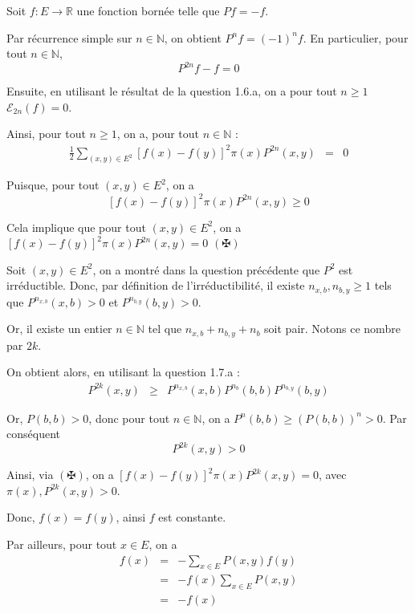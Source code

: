 Soit $f : E \rightarrow \mathbb{R}$ une fonction born{\'e}e telle que $P f = -
f$.

Par r{\'e}currence simple sur $n \in \mathbb{N}$, on obtient $P^n f = (- 1)^n
f$. En particulier, pour tout $n \in \mathbb{N}$,
\[ P^{2 n} f - f = 0 \]


Ensuite, en utilisant le r{\'e}sultat de la question 1.6.a, on a pour tout $n
\geqslant 1$ $\mathcal{E}_{2 n} (f) = 0$.

Ainsi, pour tout $n \geqslant 1$, on a, pour tout $n \in \mathbb{N}$ :
\[ \begin{array}{lll}
     \frac{1}{2} \underset{(x, y) \in E^2}{\sum}  [f (x) - f (y)]^2 \pi (x)
     {P^{2 n}}  (x, y) & = & 0
   \end{array} \]


Puisque, pour tout $(x, y) \in E^2$, on a
\[ [f (x) - f (y)]^2 \pi (x) {P^{2 n}}  (x, y) \geqslant 0 \]


Cela implique que pour tout $(x, y) \in E^2$, on a $[f (x) - f (y)]^2 \pi (x)
{P^{2 n}}  (x, y) = 0$ $(\maltese)$

Soit $(x, y) \in E^2$, on a montr{\'e} dans la question pr{\'e}c{\'e}dente que
$P^2$ est irr{\'e}ductible. Donc, par d{\'e}finition de
l'irr{\'e}ductibilit{\'e}, il existe $n_{x, b}, n_{b, y} \geqslant 1$ tels que
$P^{n_{x, b}} (x, b) > 0$ et $P^{n_{b, y}} (b, y) > 0$.

Or, il existe un entier $n \in \mathbb{N}$ tel que $n_{x, b} + n_{b, y} + n_b$
soit pair. Notons ce nombre par $2 k$.

On obtient alors, en utilisant la question 1.7.a :
\begin{eqnarray*}
  P^{2 k} (x, y) & \geqslant & P^{n_{x, b}} (x, b) P^{n_b} (b, b) P^{n_{b, y}}
  (b, y)
\end{eqnarray*}


Or, $P (b, b) > 0$, donc pour tout $n \in \mathbb{N}$, on a $P^n (b, b)
\geqslant (P (b, b))^n > 0$. Par cons{\'e}quent
\[ P^{2 k} (x, y) > 0 \]


Ainsi, via $(\maltese)$, on a $[f (x) - f (y)]^2 \pi (x) {P^{2 k}}  (x, y) =
0$, avec $\pi (x), P^{2 k} (x, y) > 0$.

Donc, $f (x) = f (y)$, ainsi $f$ est constante.

Par ailleurs, pour tout $x \in E$, on a
\begin{eqnarray*}
  f (x) & = & - \underset{x \in E}{\sum} P (x, y) f (y)\\
  & = & - f (x) \underset{x \in E}{\sum} P (x, y)\\
  & = & - f (x)
\end{eqnarray*}



